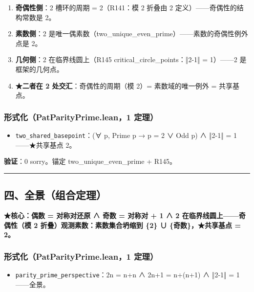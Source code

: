 \documentclass[
]{article}
\providecommand{\tightlist}{%
  \setlength{\itemsep}{0pt}\setlength{\parskip}{0pt}}
\begin{document}
\begin{enumerate}
\def\labelenumi{\arabic{enumi}.}
\tightlist
\item
  \textbf{奇偶性侧}：2 槽环的周期 = 2（R141：模 2 折叠由 2
  定义）------奇偶性的结构常数是 2。
\item
  \textbf{素数侧}：2
  是唯一偶素数（two\_unique\_even\_prime）------素数的奇偶性例外点是 2。
\item
  \textbf{几何侧}：2 在临界线圆上（R145 critical\_circle\_points：‖2-1‖
  = 1）------2 是框架的几何点。
\item
  \textbf{★二者在 2 处交汇}：奇偶性的周期（模 2）= 素数域的唯一例外 =
  共享基点。
\end{enumerate}

\subsubsection{形式化（PatParityPrime.lean，1
定理）}\label{ux5f62ux5f0fux5316patparityprime.lean1-ux5b9aux7406}

\begin{itemize}
\tightlist
\item
  \texttt{two\_shared\_basepoint}：(∀ p, Prime p → p = 2 ∨ Odd p) ∧
  ‖2-1‖ = 1------★共享基点 2。
\end{itemize}

\textbf{验证}：0 sorry。锚定 two\_unique\_even\_prime + R145。

\begin{center}\rule{0.5\linewidth}{0.5pt}\end{center}

\subsection{四、全景（组合定理）}\label{ux56dbux5168ux666fux7ec4ux5408ux5b9aux7406}

\textbf{★核心：偶数 = 对称对还原 ∧ 奇数 = 对称对 + 1 ∧ 2
在临界线圆上------奇偶性（模 2 折叠）观测素数：素数集合坍缩到 \{2\} ∪
\{奇数\}，★共享基点 = 2。}

\subsubsection{形式化（PatParityPrime.lean，1
定理）}\label{ux5f62ux5f0fux5316patparityprime.lean1-ux5b9aux7406-1}

\begin{itemize}
\tightlist
\item
  \texttt{parity\_prime\_perspective}：2n = n+n ∧ 2n+1 = n+(n+1) ∧ ‖2-1‖
  = 1------全景。
\end{itemize}
\end{document}
